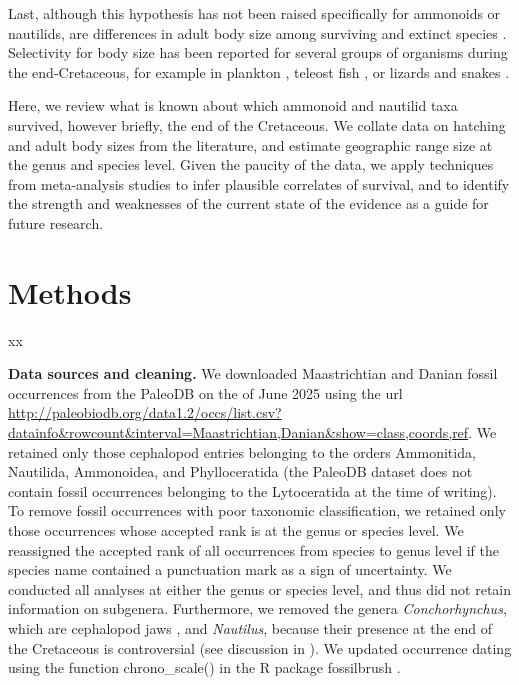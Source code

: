 \documentclass[a4paper]{article}
\begin{document}
Last, although this hypothesis has not been raised specifically for ammonoids or nautilids, are differences in 
adult body size among surviving and extinct species \parencite{monarrezMassExtinctionsAlter2021, solanExtinctionEcosystemFunction2004, payneBodySizeSampling2020}. Selectivity for body size has been reported for several groups of organisms during the end-Cretaceous, for example in plankton \parencite{yingDarknessBodySize2026}, teleost fish \parencite{friedmanEcomorphologicalSelectivityMarine2009}, or lizards and snakes \parencite{longrichMassExtinctionLizards2012}. %
 


Here, we review what is known about which ammonoid and nautilid taxa survived, however briefly, the end of the Cretaceous. We collate data on hatching and adult body sizes from the literature, and estimate geographic range size at the genus and species level. Given the paucity of the data, we apply techniques from meta-analysis studies to infer plausible correlates of survival, and to identify the strength and weaknesses of the current state of the evidence as a guide for future research. 



\section*{Methods}

xx

\textbf{Data sources and cleaning.} We downloaded Maastrichtian and Danian fossil occurrences from the PaleoDB on the  of June 2025 using the url \url{http://paleobiodb.org/data1.2/occs/list.csv?datainfo&rowcount&interval=Maastrichtian,Danian&show=class,coords,ref}. We retained only those cephalopod entries belonging to the orders Ammonitida, Nautilida, Ammonoidea, and Phylloceratida (the PaleoDB dataset does not contain fossil occurrences belonging to the Lytoceratida at the time of writing). 
To remove fossil occurrences with poor taxonomic classification, we retained only those occurrences whose accepted rank is at the genus or species level. 
We reassigned the accepted rank of all occurrences from species to genus level if the species name contained a punctuation mark as a sign of uncertainty. 
We conducted all analyses at either the genus or species level, and thus did not retain information on subgenera.
Furthermore, we removed the genera \textit{Conchorhynchus}, which are cephalopod jaws \parencite{tanabeRhyncholitesConchorhynchsCalcified1980}, and \textit{Nautilus}, because their presence at the end of the Cretaceous is controversial (see discussion in \cite{goedertMioceneNautilusMollusca2022}).
We updated occurrence dating using the function chrono\_scale() in the R package fossilbrush \parencite{flannery-sutherlandFossilbrushPackageAutomated2022}. 
\end{document}
